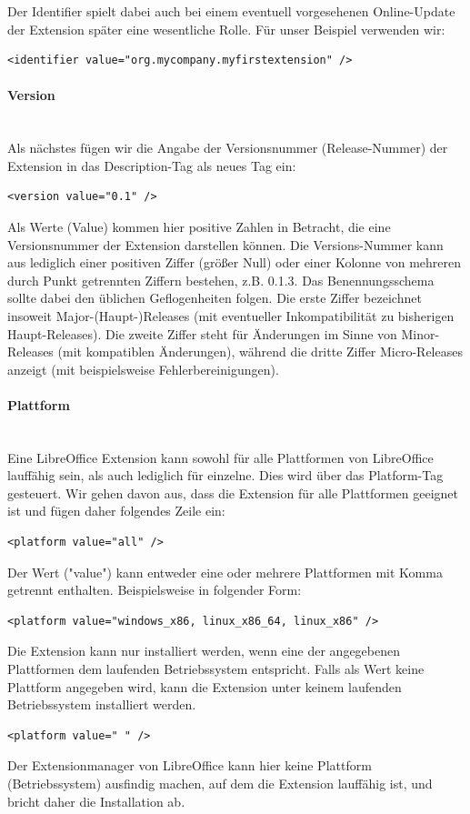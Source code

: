 \documentclass[a4paper,10pt,pagesize,titlepage]{scrbook}
\begin{document}
Der Identifier spielt dabei auch bei einem eventuell vorgesehenen Online-Update der Extension später eine wesentliche Rolle. Für unser Beispiel verwenden wir:
\begin{lstlisting}
<identifier value="org.mycompany.myfirstextension" />
\end{lstlisting}

\paragraph*{Version}$~~$\\

Als nächstes fügen wir die Angabe der Versionsnummer (Release-Nummer) der Extension in das Description-Tag als neues Tag ein:
\begin{lstlisting}
<version value="0.1" />
\end{lstlisting}
Als Werte (Value) kommen hier positive Zahlen in Betracht, die eine Versionsnummer der Extension darstellen können. Die Versions-Nummer kann aus lediglich einer positiven Ziffer (größer Null) oder einer Kolonne von mehreren durch Punkt getrennten Ziffern bestehen, z.B. 0.1.3. Das Benennungsschema sollte dabei den üblichen Geflogenheiten folgen. Die erste Ziffer bezeichnet insoweit Major-(Haupt-)Releases (mit eventueller Inkompatibilität zu bisherigen Haupt-Releases). Die zweite Ziffer steht für Änderungen im Sinne von Minor-Releases (mit kompatiblen Änderungen), während die dritte Ziffer Micro-Releases anzeigt (mit beispielsweise Fehlerbereinigungen).

\paragraph*{Plattform}$~~$\\

Eine LibreOffice Extension kann sowohl für alle Plattformen von LibreOffice lauffähig sein, als auch lediglich für einzelne. Dies wird über das Platform-Tag gesteuert. Wir gehen davon aus, dass die Extension für alle Plattformen geeignet ist und fügen daher folgendes Zeile ein:
\begin{lstlisting}
<platform value="all" />
\end{lstlisting}
Der Wert ("value") kann entweder eine oder mehrere Plattformen mit Komma getrennt enthalten. Beispielsweise in folgender Form:
\begin{lstlisting}
<platform value="windows_x86, linux_x86_64, linux_x86" /> 
\end{lstlisting} 
Die Extension kann nur installiert werden, wenn eine der angegebenen Plattformen dem laufenden Betriebssystem entspricht. Falls als Wert keine Plattform angegeben wird, kann die Extension unter keinem laufenden Betriebssystem installiert werden.
\begin{lstlisting}
<platform value=" " />
\end{lstlisting}
Der Extensionmanager von LibreOffice kann hier keine Plattform (Betriebssystem) ausfindig machen, auf dem die Extension lauffähig ist, und bricht daher die Installation ab.
\end{document}
